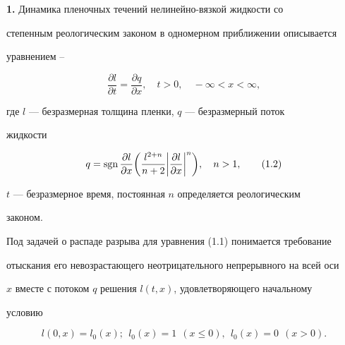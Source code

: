   




\maketitle  


\label{begin}  


  


  


{\bf 1.} Динамика пленочных течений нелинейно-вязкой жидкости со 


степенным реологическим законом в одномерном приближении описывается 


уравнением \cite{1}--\cite{3} 


\begin{equation} 


\frac{\partial l}{\partial t}=\frac{\partial q}{\partial x}, 


\quad t>0,\quad -\infty<x<\infty,\tag{1.1} 


\end{equation} 


где $l$ --- безразмерная толщина пленки, $q$ --- безразмерный поток 


жидкости 


\begin{equation} 


q=\sgn\frac{\partial l}{\partial x}\bigg(\frac{l^{2+n}}{n+2} 


\bigg|\frac{\partial l}{\partial x}\bigg|^n\bigg),\quad n>1,\tag{1.2} 


\end{equation} 


$t$ --- безразмерное время, постоянная $n$ определяется реологическим 


законом. 


 


Под задачей о распаде разрыва для уравнения (1.1) понимается требование 


отыскания его невозрастающего неотрицательного непрерывного на всей оси 


$x$ вместе с потоком $q$ решения $l(t,x)$, удовлетворяющего начальному 


условию 


\begin{equation} 


l(0,x)=l_0(x);\ \ l_0(x)=1\ \ (x\le0),\ \ l_0(x)=0\ \ (x>0).\tag{1.3} 


\end{equation} 


